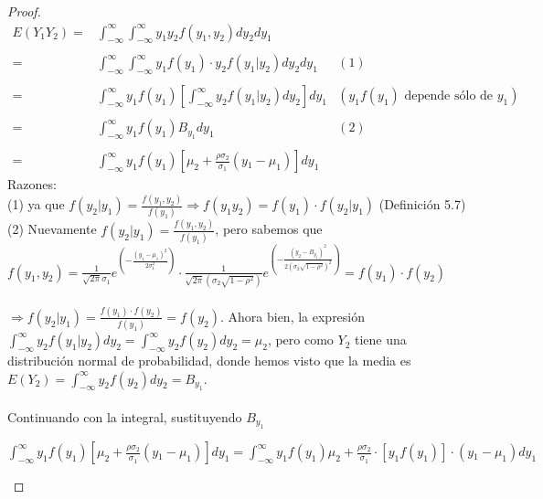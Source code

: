 \documentclass[a4paper,12pt]{article}
\begin{document}
\begin{proof}
    \[
    \begin{array}{rll}
        E(Y_1Y_2) = & \int_{-\infty}^{\infty}\int_{-\infty}^{\infty} y_1y_2f(y_1,y_2)dy_2dy_1  \\\\
         = & \int_{-\infty}^{\infty}\int_{-\infty}^{\infty} y_1f(y_1) \cdot y_2f(y_1|y_2)dy_2dy_1 & (1)\\\\
         =& \int_{-\infty}^{\infty}y_1f(y_1)\left[ \int_{-\infty}^{\infty} y_2f(y_1|y_2)dy_2 \right] dy_1& (y_1f(y_1) \text{ depende sólo de } y_1)\\\\
         =& \int_{-\infty}^{\infty}y_1f(y_1)B_{y_1} dy_1 & (2)\\\\
         =& \int_{-\infty}^{\infty}y_1f(y_1)\left [\mu_2 + \displaystyle\frac{\rho\sigma_2}{\sigma_1}(y{_1}-\mu_1) \right] dy_1
    \end{array}
    \]
    Razones:\\
    (1) ya que $f(y_2|y_1) = \displaystyle\frac{f(y_1,y_2)}{f(y_1)} \Rightarrow f(y_1y_2) = f(y_1)\cdot f(y_2|y_1) $ (Definición 5.7)\\
    (2) Nuevamente $f(y_2|y_1) = \displaystyle\frac{f(y_1,y_2)}{f(y_1)}$, pero sabemos que \\$f(y_1,y_2) = \displaystyle\frac{1}{\sqrt{2\pi}\sigma_1} e^{\left(\displaystyle-\frac{(y_1-\mu_1)^2}{2\sigma_1^2}\right)} \cdot  \frac{1}{\sqrt{2\pi}(\sigma_2\sqrt{1-\rho^2})} e^{\left(\displaystyle  - \frac{(y_2-B_{y_1})^2}{2(\sigma_2\sqrt{1-\rho^2})^2}\right)} = f(y_1)\cdot f(y_2)$ \\\\
    $\Rightarrow f(y_2|y_1) = \displaystyle\frac{f(y_1)\cdot f(y_2)}{f(y_1)}  = f(y_2)$. Ahora bien, la expresión $\int_{-\infty}^{\infty} y_2f(y_1|y_2)dy_2 = \int_{-\infty}^{\infty} y_2f(y_2)dy_2 = \mu_2$, pero como $Y_2$ tiene una distribución normal de probabilidad, donde hemos visto que la media es $E(Y_2) = \int_{-\infty}^{\infty} y_2f(y_2)dy_2 = B_{y_1} $.\\\\
    Continuando con la integral, sustituyendo $B_{y_1}$
    \begin{center}
        $\int_{-\infty}^{\infty}y_1f(y_1)\left [\mu_2 + \displaystyle\frac{\rho\sigma_2}{\sigma_1}(y{_1}-\mu_1) \right] dy_1 = \int_{-\infty}^{\infty}y_1f(y_1)\mu_2 + \displaystyle\frac{\rho\sigma_2}{\sigma_1}\cdot[y_1f(y_1)]\cdot(y{_1}-\mu_1) dy_1$\\
        

\end{center}
\end{proof}
\end{document}
